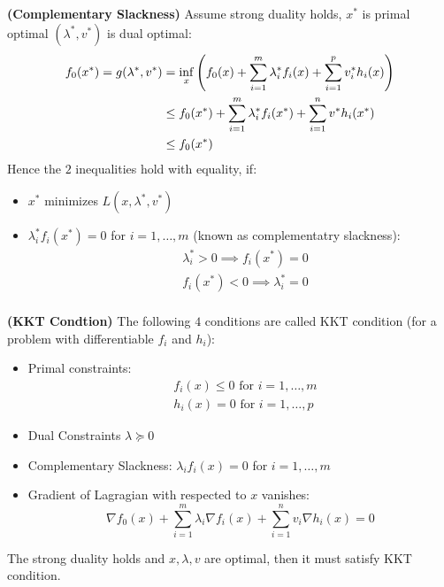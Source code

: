 \begin{definition}{\textbf{(Complementary Slackness)}}
    Assume strong duality holds, $x^*$ is primal optimal $(\lambda^*, v^*)$ is dual optimal:
    \begin{equation*}
    \begin{aligned}
        f_0(x^*) = g(\lambda^*, v^*) &= \inf_x\left(  f_0(x) + \sum^m_{i=1} \lambda^*_if_i(x) + \sum^p_{i=1}v_i^*h_i(x)  \right) \\
        &\le f_0(x^*) + \sum^m_{i=1}\lambda^*_i f_i(x^*) + \sum^n_{i=1}v^*h_i(x^*) \\
        &\le f_0(x^*)
    \end{aligned}
    \end{equation*}
    Hence the $2$ inequalities hold with equality, if:
    \begin{itemize}
        \item $x^*$ minimizes $L(x,\lambda^*, v^*)$ 
        \item $\lambda^*_if_i(x^*) = 0$ for $i=1,\dots,m$ (known as complementatry slackness):
        \begin{equation*}
        \begin{aligned}
            &\lambda^*_i>0 \implies f_i(x^*)=0 \\
            &f_i(x^*)<0 \implies \lambda_i^*=0 \\
        \end{aligned}
        \end{equation*}
    \end{itemize}
\end{definition}

\begin{definition}{\textbf{(KKT Condtion)}}
    The following $4$ conditions are called KKT condition (for a problem with differentiable $f_i$ and $h_i$):
    \begin{itemize}
        \item Primal constraints: 
        \begin{equation*}
        \begin{aligned}
            &f_i(x)\le0 \text{ for } i=1,\dots,m \\ 
            &h_i(x)=0 \text{ for } i = 1,\dots,p 
        \end{aligned} 
        \end{equation*}
        \item Dual Constraints $\lambda\succeq0$
        \item Complementary Slackness: $\lambda_if_i(x) = 0$ for $i=1,\dots,m$
        \item Gradient of Lagragian with respected to $x$ vanishes:
        \begin{equation*}
            \nabla f_0(x) + \sum^m_{i=1}\lambda_i\nabla f_i(x) + \sum^n_{i=1}v_i\nabla h_i(x) = 0
        \end{equation*}
    \end{itemize}
    The strong duality holds and $x,\lambda,v$ are optimal, then it must satisfy KKT condition. 
\end{definition}

